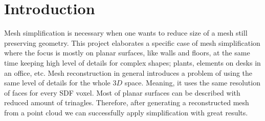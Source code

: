 \chapter{Introduction}
\setcounter{page}{1}%
\thispagestyle{empty}

Mesh simplification is necessary when one wants to reduce size of a mesh still preserving geometry. This project elaborates a specific case of mesh simplification where the focus is mostly on planar surfaces, like walls and floors, at the same time keeping high level of details for complex shapes; plants, elements on desks in an office, etc. Mesh reconstruction in general introduces a problem of using the same level of details for the whole $3D$ space. Meaning, it uses the same resolution of faces for every SDF voxel. Most of planar surfaces can be described with reduced amount of trinagles. Therefore, after generating a reconstructed mesh from a point cloud we can successfully apply simplification with great results.